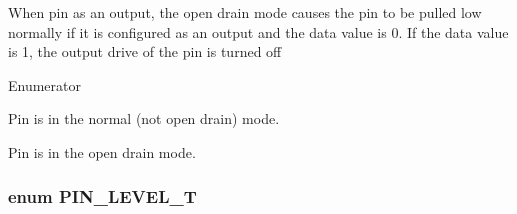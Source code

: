 When pin as an output, the open drain mode causes the pin to be pulled low normally if it is configured as an output and the data value is 0. If the data value is 1, the output drive of the pin is turned off \begin{Desc}
\item[Enumerator]\par
\begin{description}
\item[{\em 
\hypertarget{group___enumeration_ggac16e35b75166ad7286b8bb78bd244ed2afd68b1a66f2a33ce77d4f6c7f8fc998a}{N\-O\-T\-\_\-\-O\-P\-E\-N}\label{group___enumeration_ggac16e35b75166ad7286b8bb78bd244ed2afd68b1a66f2a33ce77d4f6c7f8fc998a}
}]Pin is in the normal (not open drain) mode. \item[{\em 
\hypertarget{group___enumeration_ggac16e35b75166ad7286b8bb78bd244ed2aa90b62c376675b218528e2b0b0a7f123}{O\-P\-E\-N\-\_\-\-D\-R\-A\-I\-N}\label{group___enumeration_ggac16e35b75166ad7286b8bb78bd244ed2aa90b62c376675b218528e2b0b0a7f123}
}]Pin is in the open drain mode. \end{description}
\end{Desc}
\hypertarget{group___enumeration_ga6f24594071a026b31238ab8cb80d6a80}{
\subsubsection[{P\-I\-N\-\_\-\-L\-E\-V\-E\-L\-\_\-\-T}]{\setlength{\rightskip}{0pt plus 5cm}enum {\bf P\-I\-N\-\_\-\-L\-E\-V\-E\-L\-\_\-\-T}}}\label{group___enumeration_ga6f24594071a026b31238ab8cb80d6a80}
